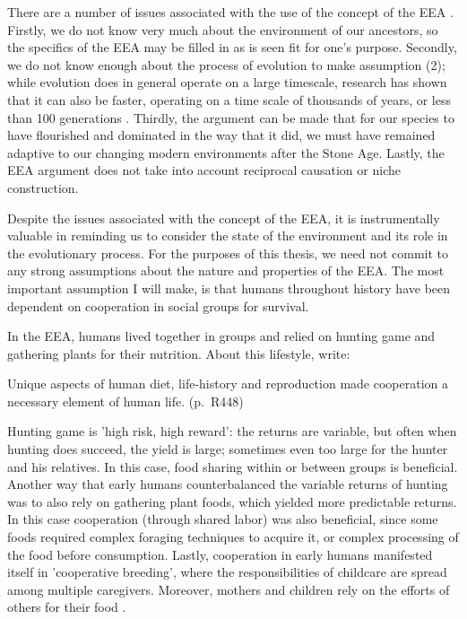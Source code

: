 There are a number of issues associated with the use of the concept of the EEA \citep{LB02}. Firstly, we do not know very much about the environment of our ancestors, so the specifics of the EEA may be filled in as is seen fit for one's purpose. Secondly, we do not know enough about the process of evolution to make assumption (2); while evolution does in general operate on a large timescale, research has shown that it can also be faster, operating on a time scale of thousands of years, or less than 100 generations \citep[pp.~190--191 and references therein]{LB02}. Thirdly, the argument can be made that for our species to have flourished and dominated in the way that it did, we must have remained adaptive to our changing modern environments after the Stone Age. Lastly, the EEA argument does not take into account reciprocal causation or niche construction.

Despite the issues associated with the concept of the EEA, it is instrumentally valuable in reminding us to consider the state of the environment and its role in the evolutionary process. For the purposes of this thesis, we need not commit to any strong assumptions about the nature and properties of the EEA. The most important assumption I will make, is that humans throughout history have been dependent on cooperation in social groups for survival.

In the EEA, humans lived together in groups and relied on hunting game and gathering plants for their nutrition.
About this lifestyle, \citet{ApicellaSilk19} write:
\begin{quoting}
    Unique aspects of human diet, life-history and reproduction made cooperation a necessary element of human life.
    \hfill (p.~R448)
\end{quoting}
Hunting game is 'high risk, high reward': the returns are variable, but often when hunting does succeed, the yield is large; sometimes even too large for the hunter and his relatives. In this case, food sharing within or between groups is beneficial.
Another way that early humans counterbalanced the variable returns of hunting was to also rely on gathering plant foods, which yielded more predictable returns. In this case cooperation (through shared labor) was also beneficial, since some foods required complex foraging techniques to acquire it, or complex processing of the food before consumption.
Lastly, cooperation in early humans manifested itself in 'cooperative breeding', where the responsibilities of childcare are spread among multiple caregivers. Moreover, mothers and children rely on the efforts of others for their food \citep{ApicellaSilk19}.

